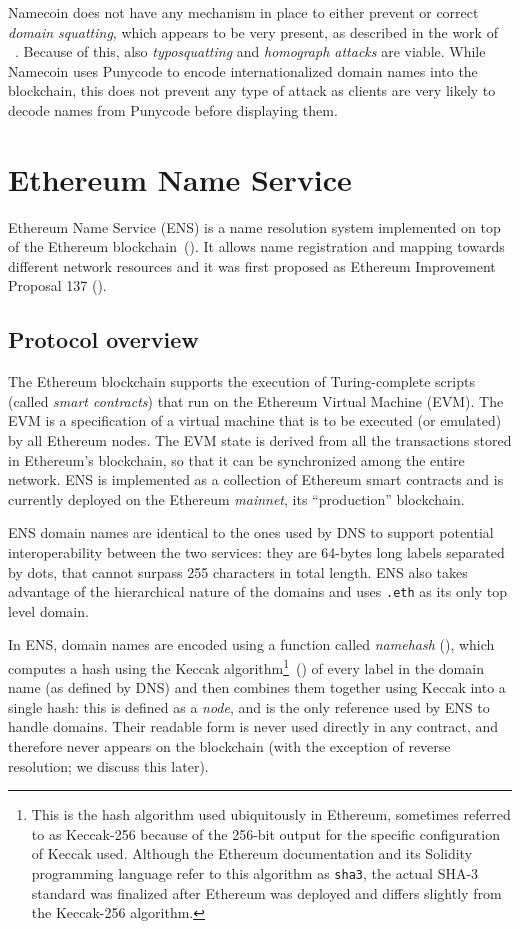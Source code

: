 \documentclass[mscthesis]{usiinfthesis}
\begin{document}
Namecoin does not have any mechanism in place to either prevent or correct \emph{domain squatting}, which appears to be very present, as described in the work of ~\cite{kalodner2015empirical}. Because of this, also \emph{typosquatting} and \emph{homograph attacks} are viable. While Namecoin uses Punycode to encode internationalized domain names into the blockchain, this does not prevent any type of attack as clients are very likely to decode names from Punycode before displaying them.

\section{Ethereum Name Service}\label{proj:ens}

Ethereum Name Service (ENS) is a name resolution system implemented on top of the Ethereum blockchain~(\cite{wood2014ethereum}). It allows name registration and mapping towards different network resources and it was first proposed as Ethereum Improvement Proposal 137 (\cite{eip:137}).

\subsection{Protocol overview}

The Ethereum blockchain supports the execution of Turing-complete scripts (called \emph{smart contracts}) that run on the Ethereum Virtual Machine (EVM). The EVM is a specification of a virtual machine that is to be executed (or emulated) by all Ethereum nodes. The EVM state is derived from all the transactions stored in Ethereum's blockchain, so that it can be synchronized among the entire network. ENS is implemented as a collection of Ethereum smart contracts and is currently deployed on the Ethereum \textit{mainnet}, its ``production'' blockchain.

ENS domain names are identical to the ones used by DNS to support potential interoperability between the two services: they are 64-bytes long labels separated by dots, that cannot surpass 255 characters in total length. ENS also takes advantage of the hierarchical nature of the domains and uses \texttt{.eth} as its only top level domain.

In ENS, domain names are encoded using a function called \emph{namehash} (\cite{eip:137}), which computes a hash using the Keccak algorithm\footnote{This is the hash algorithm used ubiquitously in Ethereum, sometimes referred to as Keccak-256 because of the 256-bit output for the specific configuration of Keccak used. Although the Ethereum documentation and its Solidity programming language refer to this algorithm as \texttt{sha3}, the actual SHA-3 standard was finalized after Ethereum was deployed and differs slightly from the Keccak-256 algorithm.}~(\cite{bertoni2009keccak}) of every label in the domain name (as defined by DNS) and then combines them together using Keccak into a single hash: this is defined as a \emph{node}, and is the only reference used by ENS to handle domains. Their readable form is never used directly in any contract, and therefore never appears on the blockchain (with the exception of reverse resolution; we discuss this later).
\end{document}
